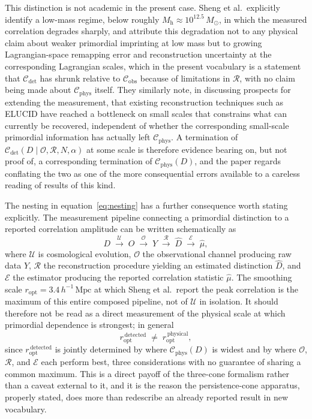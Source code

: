 \documentclass[11pt]{article}
\begin{document}
This distinction is not academic in the present case. Sheng et al.\ explicitly identify a low-mass regime, below roughly $M_{\mathrm h} \approx 10^{12.5}\,M_\odot$, in which the measured correlation degrades sharply, and attribute this degradation not to any physical claim about weaker primordial imprinting at low mass but to growing Lagrangian-space remapping error and reconstruction uncertainty at the corresponding Lagrangian scales, which in the present vocabulary is a statement that $\mathcal C_{\mathrm{det}}$ has shrunk relative to $\mathcal C_{\mathrm{obs}}$ because of limitations in $\mathcal R$, with no claim being made about $\mathcal C_{\mathrm{phys}}$ itself. They similarly note, in discussing prospects for extending the measurement, that existing reconstruction techniques such as ELUCID have reached a bottleneck on small scales that constrains what can currently be recovered, independent of whether the corresponding small-scale primordial information has actually left $\mathcal C_{\mathrm{phys}}$. A termination of $\mathcal C_{\mathrm{det}}(D \mid \mathcal O, \mathcal R, N, \alpha)$ at some scale is therefore evidence bearing on, but not proof of, a corresponding termination of $\mathcal C_{\mathrm{phys}}(D)$, and the paper regards conflating the two as one of the more consequential errors available to a careless reading of results of this kind.

The nesting in equation~\eqref{eq:nesting} has a further consequence worth stating explicitly. The measurement pipeline connecting a primordial distinction to a reported correlation amplitude can be written schematically as
\begin{equation}
D \;\xrightarrow{\ \mathcal U\ }\; O \;\xrightarrow{\ \mathcal O\ }\; Y \;\xrightarrow{\ \mathcal R\ }\; \widehat D \;\xrightarrow{\ \mathcal E\ }\; \widehat\mu,
\end{equation}
where $\mathcal U$ is cosmological evolution, $\mathcal O$ the observational channel producing raw data $Y$, $\mathcal R$ the reconstruction procedure yielding an estimated distinction $\widehat D$, and $\mathcal E$ the estimator producing the reported correlation statistic $\widehat\mu$. The smoothing scale $r_{\mathrm{opt}} = 3.4\,h^{-1}\,\mathrm{Mpc}$ at which Sheng et al.\ report the peak correlation is the maximum of this entire composed pipeline, not of $\mathcal U$ in isolation. It should therefore not be read as a direct measurement of the physical scale at which primordial dependence is strongest; in general
\begin{equation}
r_{\mathrm{opt}}^{\,\mathrm{detected}} \;\neq\; r_{\mathrm{opt}}^{\,\mathrm{physical}},
\end{equation}
since $r_{\mathrm{opt}}^{\,\mathrm{detected}}$ is jointly determined by where $\mathcal C_{\mathrm{phys}}(D)$ is widest and by where $\mathcal O$, $\mathcal R$, and $\mathcal E$ each perform best, three considerations with no guarantee of sharing a common maximum. This is a direct payoff of the three-cone formalism rather than a caveat external to it, and it is the reason the persistence-cone apparatus, properly stated, does more than redescribe an already reported result in new vocabulary.
\end{document}

